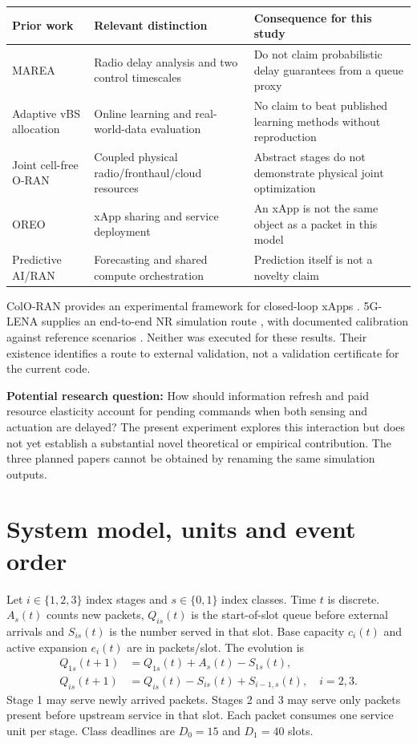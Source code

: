 \documentclass[10pt,a4paper]{article}
\newcommand{\page}[1]{\clearpage\section{#1}}
\begin{document}
\begin{center}\small
\begin{tabular}{p{30mm}p{53mm}p{67mm}}
\toprule
Prior work & Relevant distinction & Consequence for this study\\\midrule
MAREA & Radio delay analysis and two control timescales & Do not claim probabilistic delay guarantees from a queue proxy\\
Adaptive vBS allocation & Online learning and real-world-data evaluation & No claim to beat published learning methods without reproduction\\
Joint cell-free O-RAN & Coupled physical radio/fronthaul/cloud resources & Abstract stages do not demonstrate physical joint optimization\\
OREO & xApp sharing and service deployment & An xApp is not the same object as a packet in this model\\
Predictive AI/RAN & Forecasting and shared compute orchestration & Prediction itself is not a novelty claim\\\bottomrule
\end{tabular}\end{center}

ColO-RAN provides an experimental framework for closed-loop xApps \cite{coloran}.
5G-LENA supplies an end-to-end NR simulation route \cite{lena}, with documented
calibration against reference scenarios \cite{calibration}. Neither was executed
for these results. Their existence identifies a route to external validation,
not a validation certificate for the current code.

\textbf{Potential research question:} How should information refresh and paid
resource elasticity account for pending commands when both sensing and actuation
are delayed? The present experiment explores this interaction but does not yet
establish a substantial novel theoretical or empirical contribution. The three
planned papers cannot be obtained by renaming the same simulation outputs.

\page{System model, units and event order}
Let $i\in\{1,2,3\}$ index stages and $s\in\{0,1\}$ index classes. Time $t$ is
discrete. $A_s(t)$ counts new packets, $Q_{is}(t)$ is the start-of-slot queue before
external arrivals and $S_{is}(t)$ is the number served in that slot. Base capacity
$c_i(t)$ and active expansion $e_i(t)$ are in packets/slot. The evolution is
\begin{align}
Q_{1s}(t+1)&=Q_{1s}(t)+A_s(t)-S_{1s}(t),\\
Q_{is}(t+1)&=Q_{is}(t)-S_{is}(t)+S_{i-1,s}(t),\quad i=2,3.
\end{align}
Stage 1 may serve newly arrived packets. Stages 2 and 3 may serve only packets
present before upstream service in that slot. Each packet consumes one service
unit per stage. Class deadlines are $D_0=15$ and $D_1=40$ slots.
\end{document}
